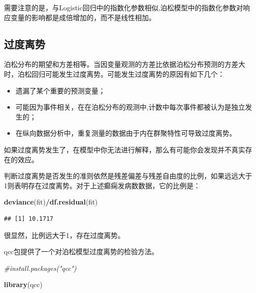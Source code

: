 \documentclass[
]{article}
\newenvironment{Shaded}{\begin{snugshade}}{\end{snugshade}}
\newcommand{\CommentTok}[1]{\textcolor[rgb]{0.56,0.35,0.01}{\textit{#1}}}
\newcommand{\KeywordTok}[1]{\textcolor[rgb]{0.13,0.29,0.53}{\textbf{#1}}}
\newcommand{\NormalTok}[1]{#1}
\newcommand{\OperatorTok}[1]{\textcolor[rgb]{0.81,0.36,0.00}{\textbf{#1}}}
\providecommand{\tightlist}{%
  \setlength{\itemsep}{0pt}\setlength{\parskip}{0pt}}
\begin{document}
需要注意的是，与Logistic回归中的指数化参数相似,泊松模型中的指数化参数对响应变量的影响都是成倍增加的，而不是线性相加。

\hypertarget{ux8fc7ux5ea6ux79bbux52bf}{%
\subsection{过度离势}\label{ux8fc7ux5ea6ux79bbux52bf}}

泊松分布的期望和方差相等。当因变量观测的方差比依据泊松分布预测的方差大时，泊松回归可能发生过度离势。可能发生过度离势的原因有如下几个：

\begin{itemize}
\tightlist
\item
  遗漏了某个重要的预测变量；
\item
  可能因为事件相关，在在泊松分布的观测中,计数中每次事件都被认为是独立发生的；
\item
  在纵向数据分析中，重复测量的数据由于内在群聚特性可导致过度离势。
\end{itemize}

如果过度离势发生了，在模型中你无法进行解释，那么有可能你会发现并不真实存在的效应。

判断过度离势是否发生的准则依然是残差偏差与残差自由度的比例，如果远远大于1则表明存在过度离势。对于上述癫痫发病数数据，它的比例是：

\begin{Shaded}
\begin{Highlighting}[]
\KeywordTok{deviance}\NormalTok{(fit)}\OperatorTok{/}\KeywordTok{df.residual}\NormalTok{(fit)}
\end{Highlighting}
\end{Shaded}

\begin{verbatim}
## [1] 10.1717
\end{verbatim}

很显然，比例远大于1，存在过度离势。

qcc包提供了一个对泊松模型过度离势的检验方法。

\begin{Shaded}
\begin{Highlighting}[]
\CommentTok{#install.packages("qcc")}
\end{Highlighting}
\end{Shaded}

\begin{Shaded}
\begin{Highlighting}[]
\KeywordTok{library}\NormalTok{(qcc)}
\end{Highlighting}
\end{Shaded}
\end{document}
